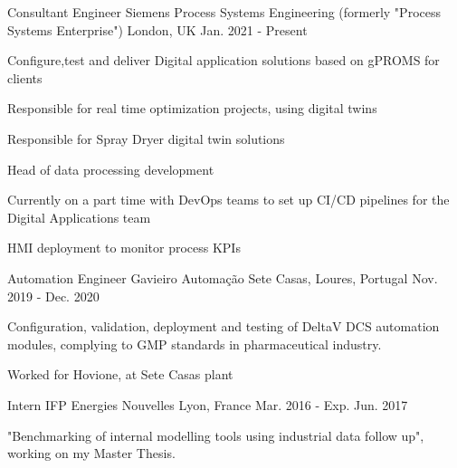 

\begin{cventries}

  \cventry
    {Consultant Engineer} %
    {Siemens Process Systems Engineering (formerly "Process Systems Enterprise")} %
    {London, UK} %
    {Jan. 2021 - Present} %
    {
      \begin{cvitems} %
        \item {Configure,test and deliver Digital application solutions based on gPROMS for clients}
        \item {Responsible for real time optimization projects, using digital twins}
        \item {Responsible for Spray Dryer digital twin solutions}
        \item {Head of data processing development}
        \item {Currently on a part time with DevOps teams to set up CI/CD pipelines for the Digital Applications team}
        \item {HMI deployment to monitor process KPIs}
      \end{cvitems}
    }

  \cventry
    {Automation Engineer} %
    {Gavieiro Automação} %
    {Sete Casas, Loures, Portugal} %
    {Nov. 2019 - Dec. 2020} %
    {
      \begin{cvitems} %
        \item {Configuration, validation, deployment and testing of DeltaV DCS automation modules, complying to GMP standards in pharmaceutical industry.}
        \item {Worked for Hovione, at Sete Casas plant}
      \end{cvitems}
    }

  \cventry
    {Intern} %
    {IFP Energies Nouvelles} %
    {Lyon, France} %
    {Mar. 2016 - Exp. Jun. 2017} %
    {
      \begin{cvitems} %
        \item {"Benchmarking of internal modelling tools using industrial data follow up", working on my Master Thesis.}
      \end{cvitems}
    }


\end{cventries}
